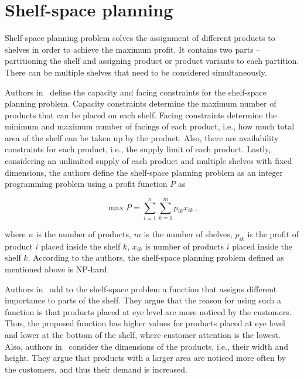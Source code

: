 \section{Shelf-space planning}\label{sec:shelf-space-planning}

Shelf-space planning problem solves the assignment of different products to shelves in order to achieve the maximum profit.
It contains two parts – partitioning the shelf and assigning product or product variants to each partition.
There can be multiple shelves that need to be considered simultaneously.

Authors in~\cite{yangStudyShelfSpace1999} define the capacity and facing constraints for the shelf-space planning problem.
Capacity constraints determine the maximum number of products that can be placed on each shelf.
Facing constraints determine the minimum and maximum number of facings of each product, i.e., how much total area of the shelf can be taken up by the product.
Also, there are availability constraints for each product, i.e., the supply limit of each product.
Lastly, considering an unlimited supply of each product and multiple shelves with fixed dimensions,
the authors define the shelf-space planning problem as an integer programming problem using a profit function $P$ as

\begin{equation}
    \max P = \sum\limits_{i=1}^n\sum\limits_{k=1}^mp_{ik} x_{ik}\,,
    \label{eq:shelf-space-planning}
\end{equation}

where $n$ is the number of products, $m$ is the number of shelves, $p_{ik}$ is the profit of product $i$ placed inside the shelf $k$, $x_{ik}$
is number of products $i$ placed inside the shelf $k$.
According to the authors, the shelf-space planning problem defined as mentioned above is NP-hard.

Authors in~\cite{hwangGeneticAlgorithmApproach2009} add to the shelf-space problem a function that assigns
different importance to parts of the shelf.
They argue that the reason for using such a function is that products placed at eye level are more noticed by the customers.
Thus, the proposed function has higher values for products placed at eye level and lower at the bottom of the shelf,
where customer attention is the lowest.
Also, authors in~\cite{hubnerMaximizingProfitAssortment2020} consider the dimensions of the products, i.e., their width and height.
They argue that products with a larger area are noticed more often by the customers, and thus their demand is increased.

